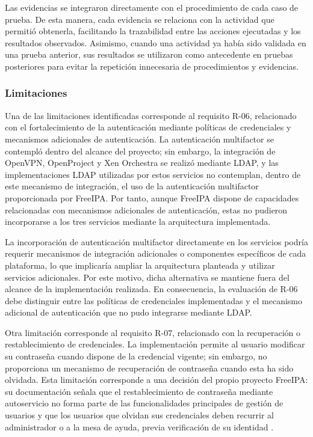Las evidencias se integraron directamente con el procedimiento de cada caso de prueba. De esta manera, cada evidencia se relaciona con la actividad que permitió obtenerla, facilitando la trazabilidad entre las acciones ejecutadas y los resultados observados. Asimismo, cuando una actividad ya había sido validada en una prueba anterior, sus resultados se utilizaron como antecedente en pruebas posteriores para evitar la repetición innecesaria de procedimientos y evidencias.

\subsubsection{Limitaciones}
Una de las limitaciones identificadas corresponde al requisito R-06, relacionado con el fortalecimiento de la autenticación mediante políticas de credenciales y mecanismos adicionales de autenticación. La autenticación multifactor se contempló dentro del alcance del proyecto; sin embargo, la integración de OpenVPN, OpenProject y Xen Orchestra se realizó mediante \ac{LDAP}, y las implementaciones \ac{LDAP} utilizadas por estos servicios no contemplan, dentro de este mecanismo de integración, el uso de la autenticación multifactor proporcionada por FreeIPA. Por tanto, aunque FreeIPA dispone de capacidades relacionadas con mecanismos adicionales de autenticación, estas no pudieron incorporarse a los tres servicios mediante la arquitectura implementada.

La incorporación de autenticación multifactor directamente en los servicios podría requerir mecanismos de integración adicionales o componentes específicos de cada plataforma, lo que implicaría ampliar la arquitectura planteada y utilizar servicios adicionales. Por este motivo, dicha alternativa se mantiene fuera del alcance de la implementación realizada. En consecuencia, la evaluación de R-06 debe distinguir entre las políticas de credenciales implementadas y el mecanismo adicional de autenticación que no pudo integrarse mediante \ac{LDAP}.

Otra limitación corresponde al requisito R-07, relacionado con la recuperación o restablecimiento de credenciales. La implementación permite al usuario modificar su contraseña cuando dispone de la credencial vigente; sin embargo, no proporciona un mecanismo de recuperación de contraseña cuando esta ha sido olvidada. Esta limitación corresponde a una decisión del propio proyecto FreeIPA: su documentación señala que el restablecimiento de contraseña mediante autoservicio no forma parte de las funcionalidades principales de gestión de usuarios y que los usuarios que olvidan sus credenciales deben recurrir al administrador o a la mesa de ayuda, previa verificación de su identidad \citep{FreeIPAReset2026}.

